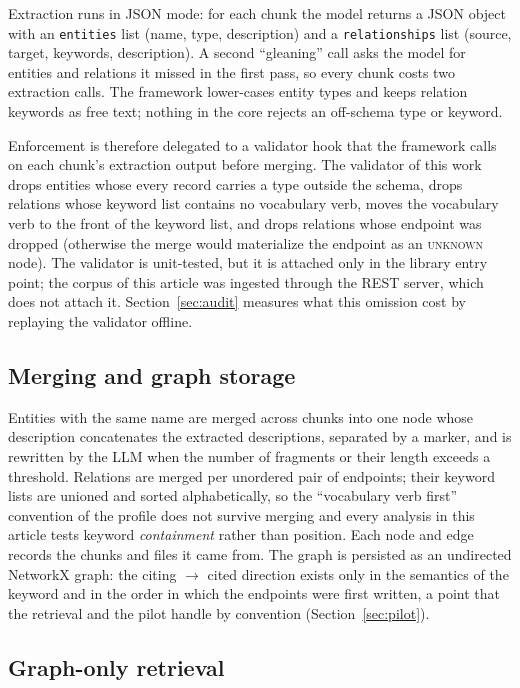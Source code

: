\documentclass[lettersize,journal]{IEEEtran}
\begin{document}
Extraction runs in JSON mode: for each chunk the model returns a JSON object with an \texttt{entities} list (name, type, description) and a \texttt{relationships} list (source, target, keywords, description). A second ``gleaning'' call asks the model for entities and relations it missed in the first pass, so every chunk costs two extraction calls. The framework lower-cases entity types and keeps relation keywords as free text; nothing in the core rejects an off-schema type or keyword.

Enforcement is therefore delegated to a validator hook that the framework calls on each chunk's extraction output before merging. The validator of this work drops entities whose every record carries a type outside the schema, drops relations whose keyword list contains no vocabulary verb, moves the vocabulary verb to the front of the keyword list, and drops relations whose endpoint was dropped (otherwise the merge would materialize the endpoint as an \textsc{unknown} node). The validator is unit-tested, but it is attached only in the library entry point; the corpus of this article was ingested through the REST server, which does not attach it. Section~\ref{sec:audit} measures what this omission cost by replaying the validator offline.

\subsection{Merging and graph storage}

Entities with the same name are merged across chunks into one node whose description concatenates the extracted descriptions, separated by a marker, and is rewritten by the LLM when the number of fragments or their length exceeds a threshold. Relations are merged per unordered pair of endpoints; their keyword lists are unioned and sorted alphabetically, so the ``vocabulary verb first'' convention of the profile does not survive merging and every analysis in this article tests keyword \emph{containment} rather than position. Each node and edge records the chunks and files it came from. The graph is persisted as an undirected NetworkX graph: the citing $\rightarrow$ cited direction exists only in the semantics of the keyword and in the order in which the endpoints were first written, a point that the retrieval and the pilot handle by convention (Section~\ref{sec:pilot}).

\subsection{Graph-only retrieval}
\label{sec:retrieval}
\end{document}
